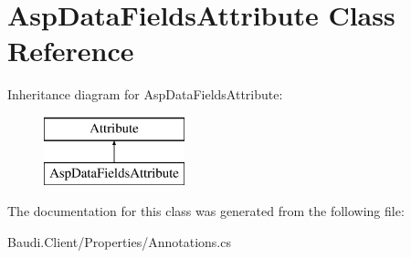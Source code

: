 \hypertarget{class_asp_data_fields_attribute}{}\section{Asp\+Data\+Fields\+Attribute Class Reference}
\label{class_asp_data_fields_attribute}
Inheritance diagram for Asp\+Data\+Fields\+Attribute\+:\begin{figure}[H]
\begin{center}
\leavevmode
\includegraphics[height=2.000000cm]{class_asp_data_fields_attribute}
\end{center}
\end{figure}


The documentation for this class was generated from the following file\+:\begin{DoxyCompactItemize}
\item 
Baudi.\+Client/\+Properties/Annotations.\+cs\end{DoxyCompactItemize}
